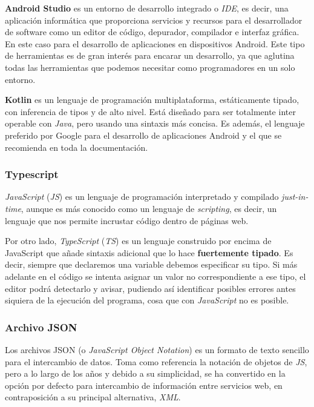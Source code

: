 \textbf{Android Studio} es un entorno de desarrollo integrado o \textit{IDE}, es decir, una aplicación informática que proporciona servicios y recursos para el desarrollador de software como un editor de código, depurador, compilador e interfaz gráfica. En este caso para el desarrollo de aplicaciones en dispositivos Android. Este tipo de herramientas es de gran interés para encarar un desarrollo, ya que aglutina todas las herramientas que podemos necesitar como programadores en un solo entorno.

\textbf{Kotlin}  es un lenguaje de programación multiplataforma, estáticamente tipado, con inferencia de tipos y de alto nivel. Está diseñado para ser totalmente inter operable con \textit{Java}, pero usando una sintaxis más concisa. Es además, el lenguaje preferido por Google para el desarrollo de aplicaciones Android y el que se recomienda en toda la documentación.

\subsubsection*{Typescript}
\textit{JavaScript} (\textit{JS}) es un lenguaje de programación interpretado y compilado \textit{just-in-time}, aunque es más conocido como un lenguaje de \textit{scripting}, es decir, un lenguaje que nos permite incrustar código dentro de páginas web.

Por otro lado, \textit{TypeScript} (\textit{TS}) es un lenguaje construido por encima de JavaScript que añade sintaxis adicional que lo hace \textbf{fuertemente tipado}. Es decir, siempre que declaremos una variable debemos especificar su tipo. Si más adelante en el código se intenta asignar un valor no correspondiente a ese tipo, el editor podrá detectarlo y avisar, pudiendo así identificar posibles errores antes siquiera de la ejecución del programa, cosa que con \textit{JavaScript} no es posible.

\subsubsection*{Archivo JSON}
Los archivos JSON (o \textit{JavaScript Object Notation}) es un formato de texto sencillo para el intercambio de datos. Toma como referencia la notación de objetos de \textit{JS}, pero a lo largo de los años y debido a su simplicidad, se ha convertido en la opción por defecto para intercambio de información entre servicios web, en contraposición a su principal alternativa, \textit{XML}.

